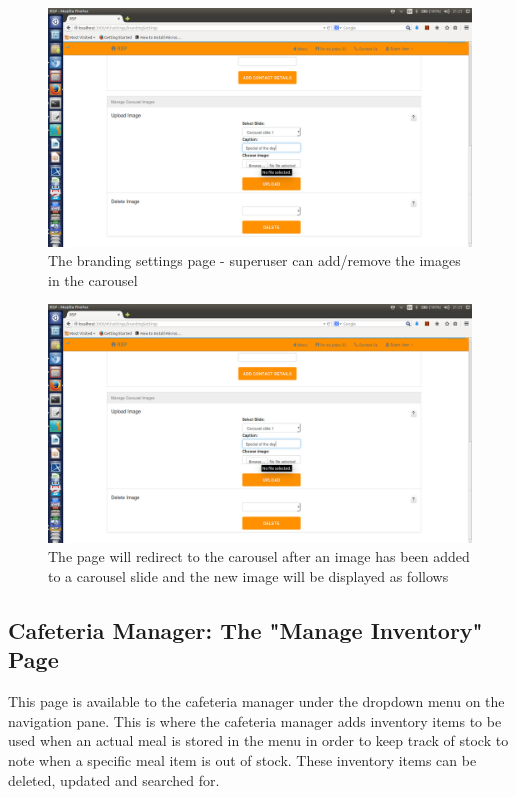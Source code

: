 \documentclass[a4paper,12pt]{report}
\begin{document}
\begin{figure}[H]
  \centering
    \includegraphics[width=1.0\textwidth]{screenshots/coverImage.png}
    \caption{The branding settings page - superuser can add/remove the images in the carousel} 
\end{figure}

\begin{figure}[H]
  \centering
    \includegraphics[width=1.0\textwidth]{screenshots/coverImage.png}
    \caption{The page will redirect to the carousel after an image has been added to a carousel slide and the new image will be displayed as follows} 
\end{figure}

\subsection{Cafeteria Manager: The "Manage Inventory" Page}
This page is available to the cafeteria manager under the dropdown menu on the navigation pane. This is where the cafeteria manager adds inventory items to be used when an actual meal is stored in the menu in order to keep track of stock to note when a specific meal item is out of stock. These inventory items can be deleted, updated and searched for. 
\end{document}
